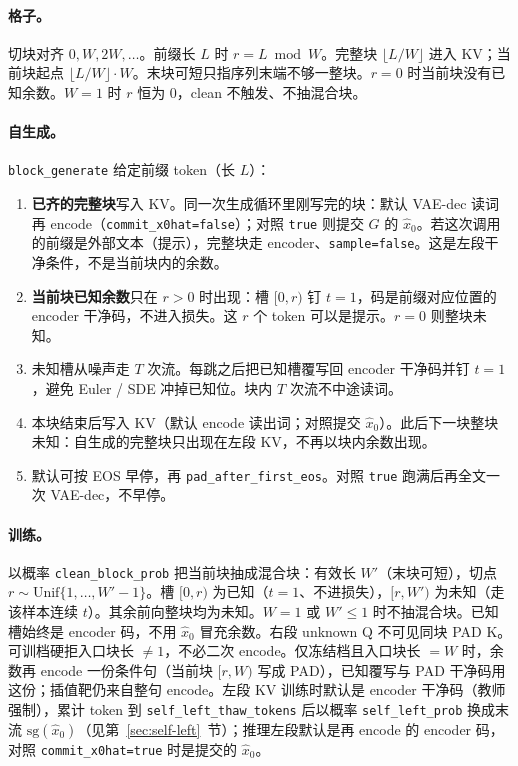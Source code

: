 \documentclass[UTF8,a4paper,11pt]{ctexart}
\begin{document}
\paragraph{格子。}
切块对齐 \(0,W,2W,\ldots\)。前缀长 \(L\) 时 \(r=L\bmod W\)。完整块 \(\lfloor L/W\rfloor\) 进入 KV；当前块起点 \(\lfloor L/W\rfloor\cdot W\)。末块可短只指序列末端不够一整块。\(r=0\) 时当前块没有已知余数。\(W=1\) 时 \(r\) 恒为 0，clean 不触发、不抽混合块。

\paragraph{自生成。}
\texttt{block\_generate} 给定前缀 token（长 \(L\)）：
\begin{enumerate}
  \item \textbf{已齐的完整块}写入 KV。同一次生成循环里刚写完的块：默认 VAE-dec 读词再 encode（\texttt{commit\_x0hat=false}）；对照 \texttt{true} 则提交 \(G\) 的 \(\hat x_0\)。若这次调用的前缀是外部文本（提示），完整块走 encoder、\texttt{sample=false}。这是左段干净条件，不是当前块内的余数。
  \item \textbf{当前块已知余数}只在 \(r>0\) 时出现：槽 \([0,r)\) 钉 \(t=1\)，码是前缀对应位置的 encoder 干净码，不进入损失。这 \(r\) 个 token 可以是提示。\(r=0\) 则整块未知。
  \item 未知槽从噪声走 \(T\) 次流。每跳之后把已知槽覆写回 encoder 干净码并钉 \(t=1\)，避免 Euler / SDE 冲掉已知位。块内 \(T\) 次流不中途读词。
  \item 本块结束后写入 KV（默认 encode 读出词；对照提交 \(\hat x_0\)）。此后下一块整块未知：自生成的完整块只出现在左段 KV，不再以块内余数出现。
  \item 默认可按 EOS 早停，再 \texttt{pad\_after\_first\_eos}。对照 \texttt{true} 跑满后再全文一次 VAE-dec，不早停。
\end{enumerate}

\paragraph{训练。}
以概率 \texttt{clean\_block\_prob} 把当前块抽成混合块：有效长 \(W'\)（末块可短），切点 \(r\sim\mathrm{Unif}\{1,\ldots,W'-1\}\)。槽 \([0,r)\) 为已知（\(t=1\)、不进损失），\([r,W')\) 为未知（走该样本连续 \(t\)）。其余前向整块均为未知。\(W=1\) 或 \(W'\le 1\) 时不抽混合块。已知槽始终是 encoder 码，不用 \(\hat x_0\) 冒充余数。右段 unknown Q 不可见同块 PAD K。可训档硬拒入口块长 \(\neq 1\)，不必二次 encode。仅冻结档且入口块长 \(=W\) 时，余数再 encode 一份条件句（当前块 \([r,W)\) 写成 PAD），已知覆写与 PAD 干净码用这份；插值靶仍来自整句 encode。左段 KV 训练时默认是 encoder 干净码（教师强制），累计 token 到 \texttt{self\_left\_thaw\_tokens} 后以概率 \texttt{self\_left\_prob} 换成末流 \(\mathrm{sg}(\hat x_0)\)（见第~\ref{sec:self-left}~节）；推理左段默认是再 encode 的 encoder 码，对照 \texttt{commit\_x0hat=true} 时是提交的 \(\hat x_0\)。
\end{document}
